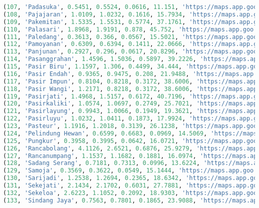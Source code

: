 \begin{lstlisting}[language=SQL]
(107, 'Padasuka', 0.5451, 0.5524, 0.0616, 11.151, 'https://maps.app.goo.gl/QnuA4GMmRkU5JWPU6'),
(108, 'Pajajaran', 1.0109, 1.0232, 0.1616, 15.7934, 'https://maps.app.goo.gl/R1EHF8WPSkUHyF4GA'),
(109, 'Pakemitan', 1.5335, 1.5531, 0.5774, 37.1761, 'https://maps.app.goo.gl/S4GUxVJbgipzCMpUA'),
(110, 'Palasari', 1.8968, 1.9191, 0.878, 45.752, 'https://maps.app.goo.gl/zVpTcy83MCGLd5dQ9'),
(111, 'Paledang', 0.3613, 0.366, 0.0567, 15.5021, 'https://maps.app.goo.gl/1A96F9AVSokovCi79'),
(112, 'Pamoyanan', 0.6309, 0.6394, 0.1411, 22.0666, 'https://maps.app.goo.gl/utzFMX8E266HcJnDA'),
(113, 'Panjunan', 0.2927, 0.296, 0.0617, 20.8296, 'https://maps.app.goo.gl/SC4hHfjXcjRvo9A1A'),
(114, 'Pasanggrahan', 1.4596, 1.5036, 0.5897, 39.2226, 'https://maps.app.goo.gl/Tb668krqVD8peFDN8'),
(115, 'Pasir Biru', 1.1597, 1.306, 0.4499, 34.444, 'https://maps.app.goo.gl/UwqrULAiicLVq5na9'),
(116, 'Pasir Endah', 0.9365, 0.9475, 0.208, 21.9488, 'https://maps.app.goo.gl/yVMBUAFg4qHdSS4D9'),
(117, 'Pasir Impun', 0.8104, 0.8218, 0.3172, 38.6006, 'https://maps.app.goo.gl/M7KSGmPBrj5CzZ4p7'),
(118, 'Pasir Wangi', 1.2171, 0.8218, 0.3172, 38.6006, 'https://maps.app.goo.gl/hqAW9sbrsgsfdpgJA'),
(119, 'Pasirjati', 1.4968, 1.5157, 0.6172, 40.7196, 'https://maps.app.goo.gl/Wt53Mo3UNu2LMXXe6'),
(120, 'Pasirkaliki', 1.0574, 1.0697, 0.2749, 25.7021, 'https://maps.app.goo.gl/g5GB76QtsVK5ixy17'),
(121, 'Pasirlayung', 0.9943, 1.0066, 0.1949, 19.3621, 'https://maps.app.goo.gl/M5hJRoN1VoMhFy1U9'),
(122, 'Pasirluyu', 1.0232, 1.0411, 0.1873, 17.9924, 'https://maps.app.goo.gl/Eacw2cZoj2zxeBkY8'),
(123, 'Pasteur', 1.1916, 1.2018, 0.3139, 26.1238, 'https://maps.app.goo.gl/kgzytm5aasfCtwWR6'),
(124, 'Pelindung Hewan', 0.6599, 0.6683, 0.0969, 14.5069, 'https://maps.app.goo.gl/Cv54XuMncrwHag6K7'),
(125, 'Pungkur', 0.3958, 0.3995, 0.0642, 16.0721, 'https://maps.app.goo.gl/ZodNjNtAnNLaoKKt5'),
(126, 'Rancabolang', 4.1126, 2.6521, 0.6876, 25.9279, 'https://maps.app.goo.gl/PyTX783DuaQPZK889'),
(127, 'Rancanumpang', 1.1537, 1.1682, 0.1881, 16.0974, 'https://maps.app.goo.gl/6V21ipTfifhKjYfN6'),
(128, 'Sadang Serang', 0.7181, 0.7313, 0.0996, 13.6224, 'https://maps.app.goo.gl/SNQEjwkY5NSecZNj7'),
(129, 'Samoja', 0.3569, 0.3622, 0.0549, 15.1444, 'https://maps.app.goo.gl/e3ppcNqNs7tF3Jm99'),
(130, 'Sarijadi', 1.2538, 1.2694, 0.2365, 18.6342, 'https://maps.app.goo.gl/6heDqMgwvQuZVFqN6'),
(131, 'Sekejati', 2.1434, 2.1702, 0.6031, 27.7881, 'https://maps.app.goo.gl/ffhX93pQDe7Z555C8'),
(132, 'Sekeloa', 2.6223, 1.1052, 0.2092, 18.9303, 'https://maps.app.goo.gl/9sCcArvefKXVnQ7X9'),
(133, 'Sindang Jaya', 0.7563, 0.7801, 0.1865, 23.9088, 'https://maps.app.goo.gl/USPZJRWzHpuKgeKr8'),

\end{lstlisting}
